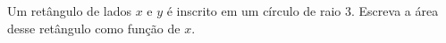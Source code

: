 Um retângulo de lados $x$ e $y$ é inscrito em um círculo de raio 3.
Escreva a área desse retângulo como função de $x$.
